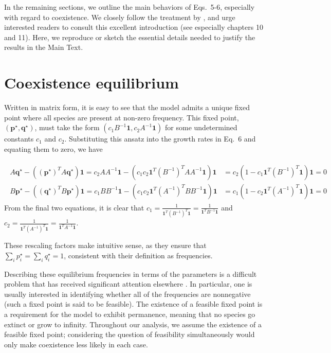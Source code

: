 \documentclass[11pt]{article}
\begin{document}
In the remaining sections, we outline the main behaviors of Eqs.~5-6, especially with regard to coexistence. We closely follow the treatment by \citet{hofbauer1998evolutionary}, and urge interested readers to consult this excellent introduction (see especially chapters 10 and 11). Here, we reproduce or sketch the essential details needed to justify the results in the Main Text.

\section{Coexistence equilibrium}

Written in matrix form, it is easy to see that the model admits a unique fixed point where all species are present at non-zero frequency. This fixed point, $(\bm{p}^\star, \bm{q}^\star)$, must take the form $(c_1 B^{-1} \bm{1}, c_2 A^{-1} \bm{1})$ for some undetermined constants $c_1$ and $c_2$. Substituting this ansatz into the growth rates in Eq.~6 and equating them to zero, we have

\begin{align}
	\begin{split}
	A \bm{q}^\star - ((\bm{p}^\star)^T A \bm{q}^\star) \bm{1} = c_2 A A^{-1} \bm{1} - (c_1 c_2 \bm{1}^T  (B^{-1})^T A A^{-1} \bm{1}) \bm{1} &= c_2 (1 - c_1 \bm{1}^T  (B^{-1})^T \bm{1}) \bm{1} = 0 \\
	B \bm{p}^\star - ((\bm{q}^\star)^T B \bm{p}^\star) \bm{1} = c_1 B B^{-1} \bm{1} - (c_1 c_2 \bm{1}^T  (A^{-1})^T B B^{-1} \bm{1}) \bm{1} &= c_1 (1 - c_2 \bm{1}^T  (A^{-1})^T \bm{1}) \bm{1} = 0
	\end{split}
\end{align}
From the final two equations, it is clear that $c_1 = \frac{1}{\bm{1}^T  (B^{-1})^T \bm{1}} = \frac{1}{\bm{1}^T  B^{-1} \bm{1}}$ and $c_2 = \frac{1}{\bm{1}^T  (A^{-1})^T \bm{1}} = \frac{1}{\bm{1}^T  A^{-1} \bm{1}}$.

These rescaling factors make intuitive sense, as they ensure that $\sum_i p^\star_i = \sum_i q^\star_i = 1$, consistent with their definition as frequencies.

Describing these equilibrium frequencies in terms of the parameters is a difficult problem that has received significant attention elsewhere \citep{eppinga2018frequency,mack2019plant,saavedra2017structural,servan2018coexistence,pettersson2020stability,saavedra2021feasibility}. In particular, one is usually interested in identifying whether all of the frequencies are nonnegative (such a fixed point is said to be feasible). The existence of a feasible fixed point is a requirement for the model to exhibit permanence, meaning that no species go extinct or grow to infinity. Throughout our analysis, we assume the existence of a feasible fixed point; considering the question of feasibility simultaneously would only make coexistence less likely in each case.
\end{document}
